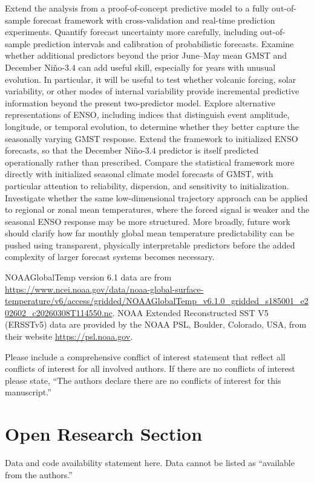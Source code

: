 \documentclass[draft]{agujournal2019}
\begin{document}
Extend the analysis from a proof-of-concept predictive model to
  a fully out-of-sample forecast framework with cross-validation and
  real-time prediction experiments. Quantify forecast uncertainty more carefully, including
  out-of-sample prediction intervals and calibration of probabilistic
  forecasts. Examine whether additional predictors beyond the prior June--May
  mean GMST and December Niño-3.4 can add useful
  skill, especially for years with unusual evolution. In particular, it will be useful to test whether volcanic
  forcing, solar variability, or other modes of internal variability
  provide incremental predictive information beyond the present
  two-predictor model. Explore alternative representations of ENSO, including indices
  that distinguish event amplitude, longitude, or temporal evolution,
  to determine whether they better capture the seasonally varying
  GMST response. Extend the framework to initialized ENSO forecasts, so that the
  December Niño-3.4 predictor is itself predicted operationally rather
  than prescribed. Compare the statistical framework more directly with initialized
  seasonal climate model forecasts of GMST, with
  particular attention to reliability, dispersion, and sensitivity to
  initialization. Investigate whether the same low-dimensional trajectory approach
  can be applied to regional or zonal mean temperatures, where the
  forced signal is weaker and the seasonal ENSO response may be more
  structured. More broadly, future work should clarify how far monthly global
  mean temperature predictability can be pushed using transparent,
  physically interpretable predictors before the added complexity of
  larger forecast systems becomes necessary.

NOAAGlobalTemp version 6.1 data are from \url{https://www.ncei.noaa.gov/data/noaa-global-surface-temperature/v6/access/gridded/NOAAGlobalTemp_v6.1.0_gridded_s185001_e202602_c20260308T114550.nc}. NOAA Extended Reconstructed SST V5 (ERSSTv5) data are provided
  by the NOAA PSL, Boulder, Colorado, USA, from their website
  \url{https://psl.noaa.gov}.

Please include a comprehensive conflict of interest statement that reflect all conflicts of interest for all involved authors. If there are no conflicts of interest please state, “The authors declare there are no conflicts of interest for this manuscript.”

\clearpage

\section*{Open Research Section}
Data and code availability statement here. Data cannot be listed as
``available from the authors.''
\end{document}
